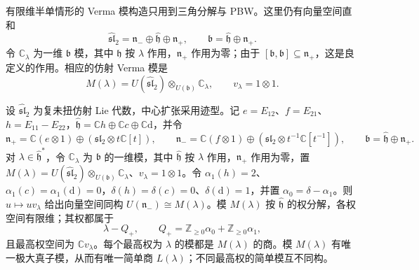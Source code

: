 \ProseParagraphBreak

有限维半单情形的 Verma 模构造只用到三角分解与 PBW。这里仍有向量空间直和
\[
	\widehat{\mathfrak{sl}}_2
	=\mathfrak n_-\oplus\widehat{\mathfrak h}\oplus\mathfrak n_+,
	\qquad \mathfrak b=\widehat{\mathfrak h}\oplus\mathfrak n_+.
\]
令 \(\mathbb C_\lambda\) 为一维 \(\mathfrak b\) 模，其中 \(\widehat{\mathfrak h}\) 按 \(\lambda\) 作用，\(\mathfrak n_+\) 作用为零；由于 \([\mathfrak b,\mathfrak b]\subseteq\mathfrak n_+\)，这是良定义的作用。相应的仿射 Verma 模是
\[
	M(\lambda)=U(\widehat{\mathfrak{sl}}_2)
	\otimes_{U(\mathfrak b)}\mathbb C_\lambda,
	\qquad v_\lambda=1\otimes1.
\]

\begin{proposition}\label{b5:prop:G-affine-verma}
	设 \(\widehat{\mathfrak{sl}}_2\) 为复未扭仿射 Lie 代数，中心扩张采用迹型。记 \(e=E_{12}\)、\(f=E_{21}\)、\(h=E_{11}-E_{22}\)，\(\widehat{\mathfrak h}=\mathbb Ch\oplus\mathbb Cc\oplus\mathbb C\mathrm d\)，并令
	\[
		\mathfrak n_+=\mathbb C(e\otimes1)\oplus(\mathfrak{sl}_2\otimes t\mathbb C[t]),\qquad
		\mathfrak n_-=\mathbb C(f\otimes1)\oplus(\mathfrak{sl}_2\otimes t^{-1}\mathbb C[t^{-1}]),
		\qquad\mathfrak b=\widehat{\mathfrak h}\oplus\mathfrak n_+.
	\]
	对 \(\lambda\in\widehat{\mathfrak h}^*\)，令 \(\mathbb C_\lambda\) 为 \(\mathfrak b\) 的一维模，其中 \(\widehat{\mathfrak h}\) 按 \(\lambda\) 作用，\(\mathfrak n_+\) 作用为零，置 \(M(\lambda)=U(\widehat{\mathfrak{sl}}_2)\otimes_{U(\mathfrak b)}\mathbb C_\lambda\)、\(v_\lambda=1\otimes1\)。令 \(\alpha_1(h)=2\)、\(\alpha_1(c)=\alpha_1(\mathrm d)=0\)，\(\delta(h)=\delta(c)=0\)、\(\delta(\mathrm d)=1\)，并置 \(\alpha_0=\delta-\alpha_1\)。则 \(u\mapsto uv_\lambda\) 给出向量空间同构 \(U(\mathfrak n_-)\cong M(\lambda)\)。模 \(M(\lambda)\) 按 \(\widehat{\mathfrak h}\) 的权分解，各权空间有限维；其权都属于
	\[
		\lambda-Q_+,\qquad Q_+=\mathbb Z_{\ge0}\alpha_0+\mathbb Z_{\ge0}\alpha_1,
	\]
	且最高权空间为 \(\mathbb Cv_\lambda\)。每个最高权为 \(\lambda\) 的模都是 \(M(\lambda)\) 的商。模 \(M(\lambda)\) 有唯一极大真子模，从而有唯一简单商 \(L(\lambda)\)；不同最高权的简单模互不同构。
\end{proposition}
